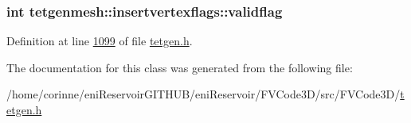 \subsubsection[{\texorpdfstring{validflag}{validflag}}]{\setlength{\rightskip}{0pt plus 5cm}int tetgenmesh\+::insertvertexflags\+::validflag}\hypertarget{classtetgenmesh_1_1insertvertexflags_a22ee846cb6922a83892692ed5a31c632}{}\label{classtetgenmesh_1_1insertvertexflags_a22ee846cb6922a83892692ed5a31c632}


Definition at line \hyperlink{tetgen_8h_source_l01099}{1099} of file \hyperlink{tetgen_8h_source}{tetgen.\+h}.



The documentation for this class was generated from the following file\+:\begin{DoxyCompactItemize}
\item 
/home/corinne/eni\+Reservoir\+G\+I\+T\+H\+U\+B/eni\+Reservoir/\+F\+V\+Code3\+D/src/\+F\+V\+Code3\+D/\hyperlink{tetgen_8h}{tetgen.\+h}\end{DoxyCompactItemize}
